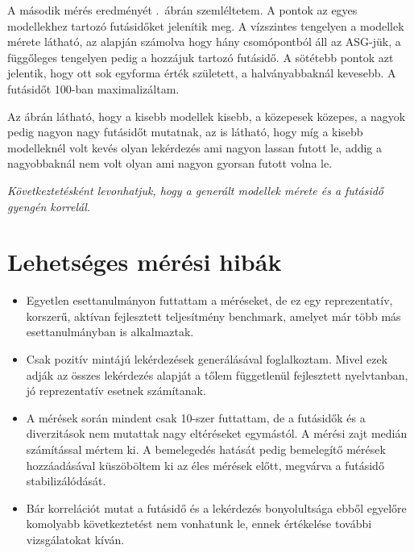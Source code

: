 A második mérés eredményét .~ábrán szemléltetem. A pontok az egyes modellekhez tartozó futásidőket jelenítik meg. A vízszintes tengelyen a modellek mérete látható, az alapján számolva hogy hány csomópontból áll az ASG-jük, a függőleges tengelyen pedig a hozzájuk tartozó futásidő. A sötétebb pontok azt jelentik, hogy ott sok egyforma érték született, a halványabbaknál kevesebb. A futásidőt 100-ban maximalizáltam. 

Az ábrán látható, hogy a kisebb modellek kisebb, a közepesek közepes, a nagyok pedig nagyon nagy futásidőt mutatnak, az is látható, hogy míg a kisebb modelleknél volt kevés olyan lekérdezés ami nagyon lassan futott le, addig a nagyobbaknál nem volt olyan ami nagyon gyorsan futott volna le.

 
\textit{Következtetésként levonhatjuk, hogy a generált modellek mérete és a futásidő gyengén korrelál.}

\section{Lehetséges mérési hibák}
\begin{itemize}
	\item Egyetlen esettanulmányon futtattam a méréseket, de ez egy reprezentatív, korszerű, aktívan fejlesztett teljesítmény benchmark, amelyet már több más esettanulmányban is alkalmaztak.\cite{garcia2017stress, bur2018distributed} 
	\item Csak pozitív mintájú lekérdezések generálásával foglalkoztam. Mivel ezek adják az összes lekérdezés alapját a tőlem függetlenül fejlesztett nyelvtanban, jó reprezentatív esetnek számítanak. 
	\item A mérések során mindent csak 10-szer futtattam, de a futásidők és a diverzitások nem mutattak nagy eltéréseket egymástól. A mérési zajt medián számítással mértem ki. A bemelegedés hatását pedig bemelegítő mérések hozzáadásával küszöböltem ki az éles mérések előtt, megvárva a futásidő stabilizálódását.
	\item Bár korrelációt mutat a futásidő és a lekérdezés bonyolultsága ebből egyelőre komolyabb következtetést nem vonhatunk le, ennek értékelése további vizsgálatokat kíván. 	
\end{itemize}





